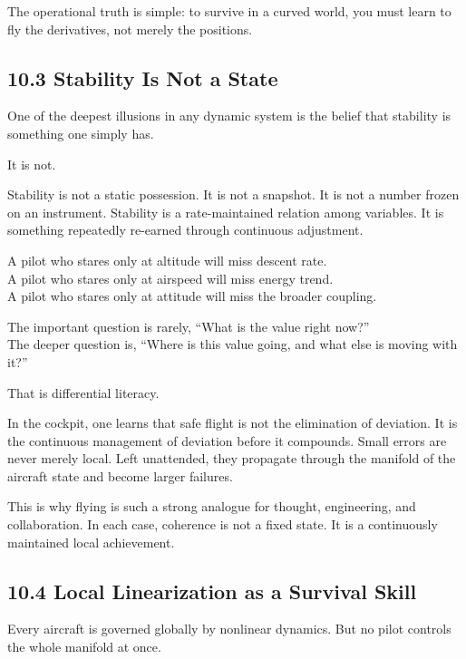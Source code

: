 The operational truth is simple: to survive in a curved world, you must
learn to fly the derivatives, not merely the positions.

\hypertarget{stability-is-not-a-state}{%
\subsection{10.3 Stability Is Not a
State}\label{stability-is-not-a-state}}

One of the deepest illusions in any dynamic system is the belief that
stability is something one simply has.

It is not.

Stability is not a static possession. It is not a snapshot. It is not a
number frozen on an instrument. Stability is a rate-maintained relation
among variables. It is something repeatedly re-earned through continuous
adjustment.

A pilot who stares only at altitude will miss descent rate.\\
A pilot who stares only at airspeed will miss energy trend.\\
A pilot who stares only at attitude will miss the broader coupling.

The important question is rarely, ``What is the value right now?''\\
The deeper question is, ``Where is this value going, and what else is
moving with it?''

That is differential literacy.

In the cockpit, one learns that safe flight is not the elimination of
deviation. It is the continuous management of deviation before it
compounds. Small errors are never merely local. Left unattended, they
propagate through the manifold of the aircraft state and become larger
failures.

This is why flying is such a strong analogue for thought, engineering,
and collaboration. In each case, coherence is not a fixed state. It is a
continuously maintained local achievement.

\hypertarget{local-linearization-as-a-survival-skill}{%
\subsection{10.4 Local Linearization as a Survival
Skill}\label{local-linearization-as-a-survival-skill}}

Every aircraft is governed globally by nonlinear dynamics. But no pilot
controls the whole manifold at once.

